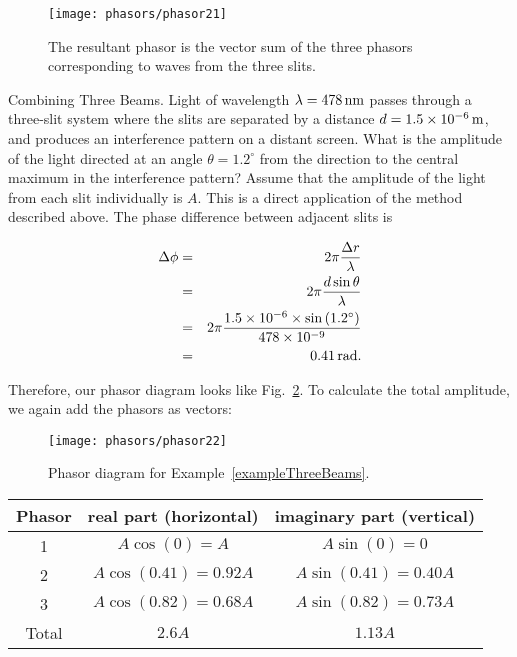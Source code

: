 \begin{figure}
\begin{center}
 \texttt{[image: phasors/phasor21]} 
\caption{\label{fig:phasor21}The resultant phasor is the vector sum of the
three phasors corresponding to waves from the three slits.}
\end{center}
\end{figure}

\begin{example}{Combining Three Beams.} 
\label{exampleThreeBeams}
Light of wavelength $\lambda = 478\,\mbox{nm}$ passes
through a three-slit system where the slits are separated by a
distance $d = 1.5 \times 10^{-6}\,\mbox{m}$, and produces an
interference pattern on a distant screen. What is the amplitude of the
light directed at an angle $\theta = 1.2^\circ$ from the direction to
the central maximum in the interference pattern? Assume that the
amplitude of the light from each slit individually is $A$.
\solution
This is a direct application of the method described above. The phase
difference between adjacent slits is

\begin{eqnarray*}
\Delta \phi & = & 2\pi \frac{\Delta r}{\lambda}\\
            & = & 2\pi \frac{d\sin{\theta}}{\lambda} \\
            & = & 2\pi \frac{1.5 \times 10^{-6}\times \sin{(1.2^\circ)}}
            {478 \times 10^{-9}} \\
            & = & 0.41\,\mbox{rad}.\\
\end{eqnarray*}

Therefore, our phasor diagram looks like Fig.~\ref{fig:phasor22}.
To calculate the total amplitude, we again add the phasors as vectors:

\begin{figure}[b]
\begin{center}
 \texttt{[image: phasors/phasor22]} 
\caption{\label{fig:phasor22}Phasor diagram for Example~\ref{exampleThreeBeams}.}
\end{center}
\end{figure}


\renewcommand{\arraystretch}{2.0}
\begin{center}
\begin{tabular}{|c|c|c|}\hline
\quad Phasor\quad &
\quad real part (horizontal) \quad &
\quad imaginary part (vertical) \quad \\ 
\hline\hline
1      & $A\cos\left(0\right) = A$ & $A\sin\left(0\right) = 0$ \\
\hline
2      & $A\cos\left(0.41\right)= 0.92A$ & $A\sin\left(0.41\right) = 0.40A$ \\
\hline
3      & $A\cos\left(0.82\right)=0.68A$ & $A\sin\left(0.82\right)=0.73A$ \\
\hline
\hline
Total  & $2.6A$   & $1.13A$ \\
\hline
\end{tabular}
\end{center}
\renewcommand{\arraystretch}{1.0}


\end{example}
